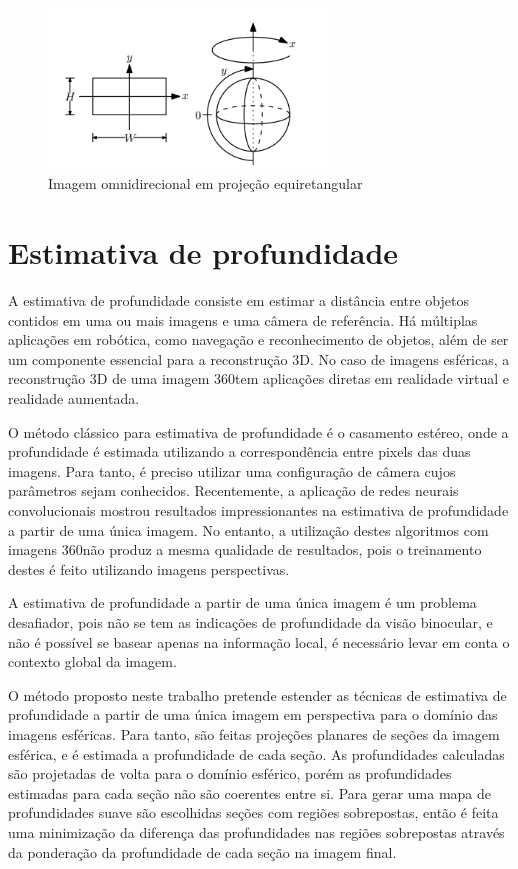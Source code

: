 \documentclass[cic,tc]{iiufrgs}
\begin{document}
\begin{figure}
    \caption{Imagem omnidirecional em projeção equiretangular}
    \begin{center}
        \includegraphics[width=20em]{equiretangular.png}
    \end{center}
    \label{fig:sphericalIm}
\end{figure}

\section{Estimativa de profundidade}
A estimativa de profundidade consiste em estimar a distância entre objetos contidos em uma ou mais imagens e uma câmera de referência. Há múltiplas aplicações em robótica, como navegação e reconhecimento de objetos, além de ser um componente essencial para a reconstrução 3D. No caso de imagens esféricas, a reconstrução 3D de uma imagem 360\degree tem aplicações diretas em realidade virtual e realidade aumentada.

O método clássico para estimativa de profundidade é o casamento estéreo, onde a profundidade é estimada utilizando a correspondência entre pixels das duas imagens. Para tanto, é preciso utilizar uma configuração de câmera cujos parâmetros sejam conhecidos. Recentemente, a aplicação de redes neurais convolucionais mostrou resultados impressionantes na estimativa de profundidade a partir de uma única imagem. No entanto, a utilização destes algoritmos com imagens 360\degree não produz a mesma qualidade de resultados, pois o treinamento destes é feito utilizando imagens perspectivas. 

A estimativa de profundidade a partir de uma única imagem é um problema desafiador, pois não se tem as indicações de profundidade da visão binocular, e não é possível se basear apenas na informação local, é necessário levar em conta o contexto global da imagem.

O método proposto neste trabalho pretende estender as técnicas de estimativa de profundidade a partir de uma única imagem em perspectiva para o domínio das imagens esféricas. Para tanto, são feitas projeções planares de seções da imagem esférica, e é estimada a profundidade de cada seção. As profundidades calculadas são projetadas de volta para o domínio esférico, porém as profundidades estimadas para cada seção não são coerentes entre si.
Para gerar uma mapa de profundidades suave são escolhidas seções com regiões sobrepostas, então é feita uma minimização da diferença das profundidades nas regiões sobrepostas através da ponderação da profundidade de cada seção na imagem final.
\end{document}
